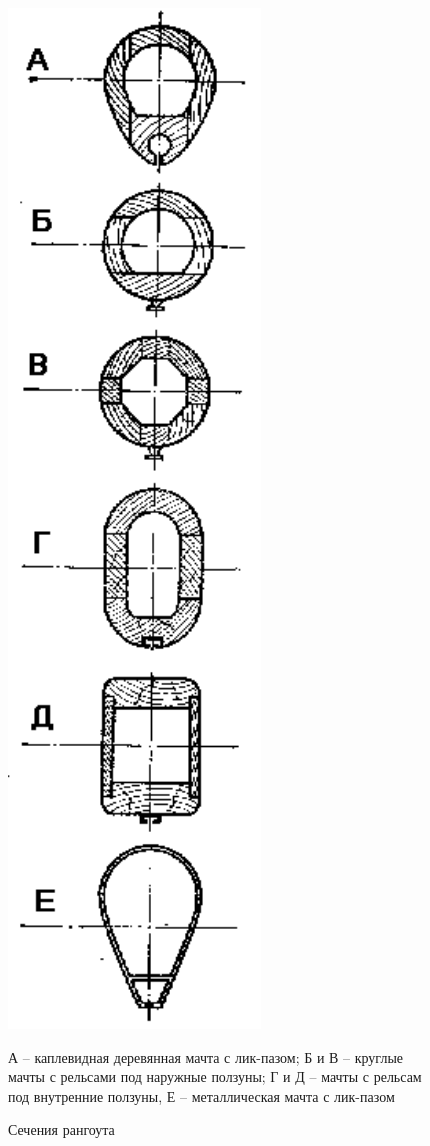 \documentclass[a4paper, 12pt, twoside, final]{scrbook}
\begin{document}
\begin{figure}[htbp]
\centering\includegraphics{pics/Sechenija_rangouta}
\caption{Сечения рангоута}
\label{fig:37}
\centering\small
А \--- каплевидная деревянная мачта с лик-пазом; Б и В \--- круглые мачты
с рельсами под наружные ползуны; Г и Д \--- мачты с рельсам под внутренние
ползуны, Е \--- металлическая мачта с лик-пазом 
\end{figure}
\end{document}
